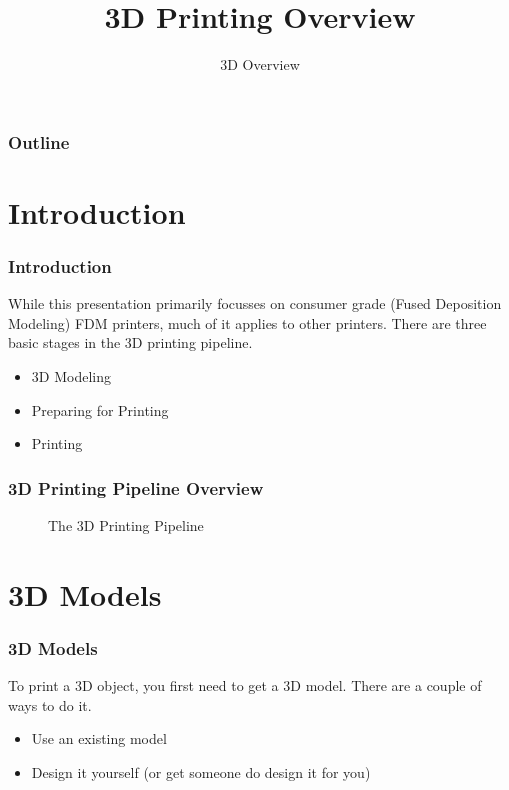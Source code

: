 \documentclass[english,10pt]{beamer}
\title{3D Printing Overview}
\subtitle{3D Overview}
\begin{document}
\begin{frame}
  \titlepage
\end{frame}

\begin{frame}
  \frametitle{Outline}
  \tableofcontents
\end{frame}

\section{Introduction}
\begin{frame}
  \frametitle{Introduction}
  While this presentation primarily focusses on consumer grade (Fused Deposition Modeling) FDM printers, much of it applies to other printers.  There are three basic stages in the 3D printing pipeline.
  \begin{itemize}
    \item 3D Modeling
    \item Preparing for Printing
    \item Printing
  \end{itemize}
\end{frame}

\begin{frame}
  \frametitle{3D Printing Pipeline Overview}
  \begin{figure}
    
    \caption{The 3D Printing Pipeline}
  \end{figure}
\end{frame}

\section{3D Models}
\begin{frame}
  \frametitle{3D Models}
  To print a 3D object, you first need to get a 3D model.  There are a couple of ways to do it.
  \begin{itemize}
    \item Use an existing model
    \item Design it yourself (or get someone do design it for you)
  \end{itemize}
\end{frame}
\end{document}
